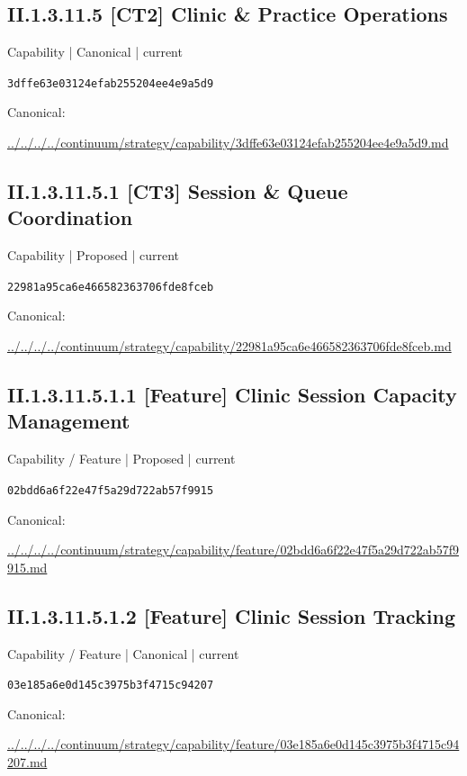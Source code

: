 \documentclass[10pt,a4paper]{article}
\begin{document}
\subsection*{II.1.3.11.5 [CT2] Clinic \& Practice Operations}
{\small Capability | Canonical | current}\par
\texttt{3dffe63e03124efab255204ee4e9a5d9}\par
Canonical: \par
{\footnotesize\url{../../../../continuum/strategy/capability/3dffe63e03124efab255204ee4e9a5d9.md}}\par
\subsection*{II.1.3.11.5.1 [CT3] Session \& Queue Coordination}
{\small Capability | Proposed | current}\par
\texttt{22981a95ca6e466582363706fde8fceb}\par
Canonical: \par
{\footnotesize\url{../../../../continuum/strategy/capability/22981a95ca6e466582363706fde8fceb.md}}\par
\subsection*{II.1.3.11.5.1.1 [Feature] Clinic Session Capacity Management}
{\small Capability / Feature | Proposed | current}\par
\texttt{02bdd6a6f22e47f5a29d722ab57f9915}\par
Canonical: \par
{\footnotesize\url{../../../../continuum/strategy/capability/feature/02bdd6a6f22e47f5a29d722ab57f9915.md}}\par
\subsection*{II.1.3.11.5.1.2 [Feature] Clinic Session Tracking}
{\small Capability / Feature | Canonical | current}\par
\texttt{03e185a6e0d145c3975b3f4715c94207}\par
Canonical: \par
{\footnotesize\url{../../../../continuum/strategy/capability/feature/03e185a6e0d145c3975b3f4715c94207.md}}\par
\end{document}
